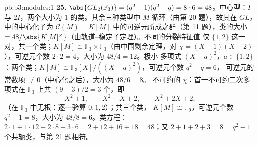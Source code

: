 \begin{solution}{pb:b3:modules:1}
\textbf{25.} $\abs{GL_2(\mathbb F_3)} = (q^2 - 1)(q^2 - q) =
8 \cdot 6 = 48$。中心型：$I$ 与 $2I$，两个大小为
$1$ 的类。其余三种类型中 $M$ 循环（由第
20 题），故其在 $GL_2$ 中的中心化子为
$\mathcal C(M) = K[M]$ 中的可逆元所成之群（第 11 题），类的大小
$=48/\abs{K[M]^\times}$（由轨道–稳定子定理）。不同的分裂特征值
仅 $\{1, 2\}$ 这一对，共一个类；$K[M]
\cong \mathbb F_3 \times \mathbb F_3$（由中国剩余定理，对 $\chi = (X-1)
(X-2)$），可逆元个数 $2 \cdot 2 = 4$，大小为 $48/4 = 12$。极小
多项式 $(X - a)^2$，$a \in \{1, 2\}$：两个类；$K[M] \cong
\mathbb F_3[X]/((X-a)^2)$，可逆元个数 $q^2 - q = 6$，
可逆元的常数项 $\neq 0$（中心化之后），大小为 $48/6 = 8$。
不可约的 $\chi$：首一不可约二次多项式在
$\mathbb F_3$ 上共 $(9 - 3)/2 = 3$ 个，即
\[
X^2 + 1, \qquad X^2 + X + 2, \qquad X^2 + 2X + 2,
\]
（在 $\mathbb F_3$ 中无根：逐一验算 $0, 1, 2$）；共三个类，
$K[M] \cong \mathbb F_9$，可逆元个数 $q^2 - 1 = 8$，大小为 $48/8 =
6$。类方程：$2\cdot1 + 1\cdot12 + 2\cdot8 + 3\cdot6 =
2 + 12 + 16 + 18 = 48$；又 $2 + 1 + 2 + 3 = 8 = q^2 - 1$
个共轭类，与第 21 题相符。
\end{solution}
